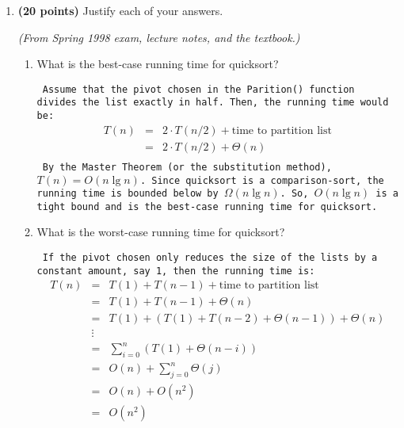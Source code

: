 \begin{enumerate}
\newpage
    \item {\bf (20 points)} 
	Justify each of your answers.

	{\em (From Spring 1998 exam, lecture notes, and the textbook.)}

	\begin{enumerate}
	    \item What is the best-case running time for quicksort?

{\tt
Assume that the pivot chosen in the Parition() function divides the list
exactly in half.  Then, the running time would be:
$$
\begin{array}{rcl}
    T(n) &=& 2 \cdot T(n/2) + \mbox{time to partition list}\\
    	&=& 2 \cdot T(n/2) + \Theta(n)\\
\end{array}
$$
By the Master Theorem (or the substitution method), $T(n) = O(n\lg n)$.
Since quicksort is a comparison-sort, the running time is bounded below
by $\Omega(n \lg n)$.  So, $O(n\lg n)$ is a tight bound and
is the best-case running time for quicksort.
}
	    \item What is the worst-case running time for quicksort?

{\tt
If the pivot chosen only reduces the size of the lists by a constant
amount, say 1, then the running time is:
$$
\begin{array}{rcl}
    T(n) &=& T(1) + T(n-1) + \mbox{time to partition list}\\
    	&=& T(1) + T(n-1) + \Theta(n)\\
    	&=& T(1) + (T(1)+T(n-2)+\Theta(n-1)) + \Theta(n)\\
	&\vdots&\\
    	&=& \sum_{i=0}^n (T(1) + \Theta(n-i))\\
    	&=& O(n) + \sum_{j=0}^n \Theta(j)\\
    	&=& O(n) + O(n^2)\\
    	&=& O(n^2)\\
\end{array}
$$
}

	\end{enumerate}


\end{enumerate}
